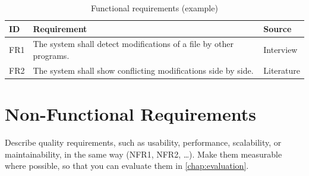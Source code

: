 \begin{table}[htbp]
  \centering
  \caption{Functional requirements (example)}
  \label{tab:requirements:functional}
  \begin{tabularx}{\textwidth}{@{}lXl@{}}
    \toprule
    ID   & Requirement & Source \\
    \midrule
    FR1  & The system shall detect modifications of a file by other programs. & Interview \\
    FR2  & The system shall show conflicting modifications side by side. & Literature \\
    \bottomrule
  \end{tabularx}
\end{table}

\section{Non-Functional Requirements}\label{sec:requirements:non-functional}

Describe quality requirements, such as usability, performance, scalability, or maintainability, in the same way (NFR1, NFR2, \ldots).
Make them measurable where possible, so that you can evaluate them in \cref{chap:evaluation}.
